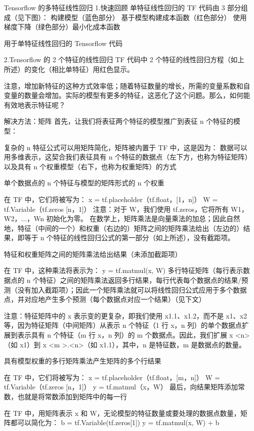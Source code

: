 \documentclass[11pt]{book} %
\begin{document}
Tensorflow 的多特征线性回归
1.快速回顾
单特征线性回归的 TF 代码由 3 部分组成（见下图）：
构建模型（蓝色部分）
基于模型构建成本函数（红色部分）
使用梯度下降（绿色部分）最小化成本函数

用于单特征线性回归的 Tensorflow 代码 

2.Tensorflow 的 2 个特征的线性回归
TF 代码中 2 个特征的线性回归方程（如上所述）的变化（相比单特征）用红色显示。

注意，增加新特征的这种方式效率低；随着特征数量的增长，所需的变量系数和自变量的数量会增加。实际的模型有更多的特征，这恶化了这个问题。那么，如何能有效地表示特征呢？

解决方法：矩阵
首先，让我们将表征两个特征的模型推广到表征 n 个特征的模型：


复杂的 n 特征公式可以用矩阵简化，矩阵被内置于 TF 中，这是因为：
数据可以用多维表示，这契合我们表征具有 n 个特征的数据点（左下方，也称为特征矩阵）以及具有 n 个权重模型（右下，也称为权重矩阵）的方式

单个数据点的 n 个特征与模型的矩阵形式的 n 个权重 

在 TF 中，它们将被写为：
x = tf.placeholder（tf.float，[1，n]）
W = tf.Variable（tf.zeros [n，1]）
注意：对于 W，我们使用 tf.zeros，它将所有 W1，W2，...，Wn 初始化为零。
在数学上，矩阵乘法是向量乘法的加总；因此自然地，特征（中间的一个）和权重（右边的）矩阵之间的矩阵乘法给出（左边的）结果，即等于 n 个特征的线性回归公式的第一部分（如上所述），没有截距项。


特征和权重矩阵之间的矩阵乘法给出结果（未添加截距项） 

在 TF 中，这种乘法将表示为：
y = tf.matmul(x, W)
多行特征矩阵（每行表示数据点的 n 个特征）之间的矩阵乘法返回多行结果，每行代表每个数据点的结果/预测（没有加入截距项）；因此一个矩阵乘法就可以将线性回归公式应用于多个数据点，并对应地产生多个预测（每个数据点对应一个结果）（见下文）

注意：特征矩阵中的 x 表示变的更复杂，即我们使用 x1.1、x1.2，而不是 x1、x2 等，因为特征矩阵（中间矩阵）从表示 n 个特征（1 行 x，n 列）的单个数据点扩展到表示具有 n 个特征（m 行 x，n 列）的 m 个数据点。因此，我们扩展 x <n>（如 x1）到 x <m >.<n>（如 x1.1），其中，n 是特征数，m 是数据点的数量。

具有模型权重的多行矩阵乘法产生矩阵的多个行结果 

在 TF 中，它们将被写为：
x = tf.placeholder（tf.float，[m，n]）
W = tf.Variable（tf.zeros [n，1]）
y = tf.matmul（x，W）
最后，向结果矩阵添加常数，也就是将常数添加到矩阵中的每一行 

在 TF 中，用矩阵表示 x 和 W，无论模型的特征数量或要处理的数据点数量，矩阵都可以简化为：
b = tf.Variable(tf.zeros[1])
y = tf.matmul(x, W) + b
\end{document}
